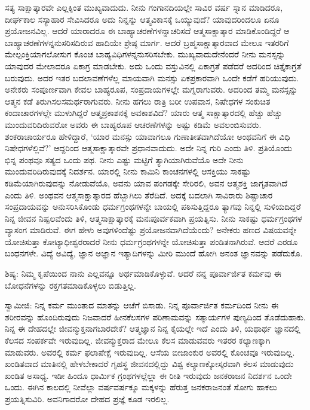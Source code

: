 ಸತ್ಯ ಸಾಕ್ಷಾತ್ಕಾರವೇ ಎಲ್ಲಕ್ಕಿಂತ ಮುಖ್ಯವಾದುದು. ನೀನು ಗಂಗಾನದಿಯಲ್ಲೇ ಸಾವಿರ ವರ್ಷ ಸ್ನಾನ ಮಾಡಿದರೂ, ದೀರ್ಘಕಾಲ ಸಸ್ಯಾಹಾರ ಸೇವಿಸಿದರೂ ಅದು ನಿನ್ನನ್ನು ಆತ್ಮವಿಕಾಸಕ್ಕೆ ಒಯ್ಯುವುದೆ? ಯಾವುದರಿಂದಲೂ ಏನೂ ಪ್ರಯೋಜನವಿಲ್ಲ. ಆದರೆ ಯಾರಾದರೂ ಈ ಬಾಹ್ಯಾಚರಣೆಗಳನ್ನಾಚರಿಸದೆ ಆತ್ಮಸಾಕ್ಷಾತ್ಕಾರ ಮಾಡಿಕೊಂಡಿದ್ದರೆ ಆ ಬಾಹ್ಯಾಚರಣೆಗಳನ್ನನುಸರಿಸದಿರುವ ಹಾದಿಯೇ ಶ್ರೇಷ್ಠ ಮಾರ್ಗ. ಆದರೆ ಬ್ರಹ್ಮಸಾಕ್ಷಾತ್ಕಾರವಾದ ಮೇಲೂ ಇತರರಿಗೆ ಮೇಲ್ಪಂಕ್ತಿಯಾಗಲೋಸುಗ ಕೊಂಚ ಬಾಹ್ಯವಿಧಿಗಳನ್ನನುಸರಿಸಬೇಕು. ಮುಖ್ಯವಾದುದೇನೆಂದರೆ ನೀನು ಮನಸ್ಸನ್ನು ಯಾವುದರ ಮೇಲಾದರೂ ಏಕಾಗ್ರ ಮಾಡಬೇಕು. ಅದು ಒಂದು ವಸ್ತುವಿನಲ್ಲಿ ಏಕಾಗ್ರತೆ ಪಡೆದರೆ ಅದರಿಂದ ಚಿತ್ತೈಕಾಗ್ರತೆ ಬರುವುದು. ಅದರ ಇತರ ಬದಲಾವಣೆಗಳೆಲ್ಲ ಮಾಯವಾಗಿ ಮನಸ್ಸು ಏಕಪ್ರಕಾರವಾಗಿ ಒಂದೇ ಕಡೆಗೆ ಹರಿಯುವುದು. ಅನೇಕರು ಸಂಪೂರ್ಣವಾಗಿ ಕೇವಲ ಬಾಹ್ಯರೂಪ, ಸಂಪ್ರದಾಯಗಳಲ್ಲೇ ಮಗ್ನರಾಗುವರು. ಅದರಿಂದ ತಮ್ಮ ಮನಸ್ಸನ್ನು ಆತ್ಮನ ಕಡೆ ತಿರುಗಿಸಲಸಮರ್ಥರಾಗುವರು. ನೀನು ಹಗಲು ರಾತ್ರಿ ಬರೀ ಉಪವಾಸ, ನಿಷೇಧಗಳ ಸಂಕುಚಿತ ಕಂದಾಚಾರಗಳಲ್ಲೇ ಮುಳುಗಿದ್ದರೆ ಆತ್ಮಪ್ರಕಾಶನಕ್ಕೆ ಅವಕಾಶವಿದೆ? ಯಾರು ಆತ್ಮ ಸಾಕ್ಷಾತ್ಕಾರದಲ್ಲಿ ಹೆಚ್ಚು ಹೆಚ್ಚು ಮುಂದುವರಿದಿರುವರೋ ಅವರು ಈ ಬಾಹ್ಯರೂಪ ಆಚರಣೆಗಳನ್ನು ಅಷ್ಟು ಕಡಿಮೆ ಅವಲಂಬಿಸುವರು. ಶಂಕರಾಚಾರ್ಯರೂ ಹೇಳಿದ್ದಾರೆ, ‘ಯಾರ ಮನಸ್ಸು ಯಾವಾಗಲೂ ಗುಣಾತೀತವಾಗಿದೆಯೋ ಅಂಥವನಿಗೆ ಈ ವಿಧಿ ನಿಷೇಧಗಳೆಲ್ಲಿವೆ?’ ಆದ್ದರಿಂದ ಆತ್ಮಸಾಕ್ಷಾತ್ಕಾರವೇ ಪ್ರಧಾನವಾದುದು. ಅದೇ ನಿನ್ನ ಗುರಿ ಎಂದು ತಿಳಿ. ಪ್ರತಿಯೊಂದು ಭಿನ್ನ ಪಂಥವೂ ಸತ್ಯದ ಒಂದು ಪಥ. ನೀನು ಎಷ್ಟು ಮಟ್ಟಿಗೆ ತ್ಯಾಗಿಯಾಗಿರುವೆಯೊ ಅದೇ ನೀನು ಮುಂದುವರಿದಿರುವುದಕ್ಕೆ ನಿದರ್ಶನ. ಯಾರಲ್ಲಿ ನೀನು ಕಾಮಿನಿ ಕಾಂಚನಗಳಲ್ಲಿ ಆಸಕ್ತಿಯು ಸಾಕಷ್ಟು ಕಡಿಮೆಯಾಗಿರುವುದನ್ನು ನೋಡುವೆಯೊ, ಅವನು ಯಾವ ಪಂಗಡಕ್ಕೇ ಸೇರಿರಲಿ, ಅವನ ಆತ್ಮಶಕ್ತಿ ಜಾಗೃತವಾಗಿದೆ ಎಂದು ತಿಳಿ. ಅಂಥವನ ಆತ್ಮಸಾಕ್ಷಾತ್ಕಾರದ ಹೆಬ್ಬಾಗಿಲು ತೆರೆದಿದೆ. ಅದಕ್ಕೆ ಬದಲಾಗಿ ಸಾವಿರಾರು ಶಿಷ್ಟಾಚಾರ ಸಂಪ್ರದಾಯವನ್ನು ಅನುಸರಿಸಿಕೊಂಡು ಧರ್ಮಗ್ರಂಥಗಳನ್ನೇ ಬಾಯಲ್ಲಿ ಪಠಿಸುತ್ತಿದ್ದರೂ ತ್ಯಾಗವು ನಿನ್ನಲ್ಲಿ ಸುಳಿಯದಿದ್ದರೆ ನಿನ್ನ ಜೀವನ ನಿಷ್ಪಲವೆಂದು ತಿಳಿ, ಆತ್ಮಸಾಕ್ಷಾತ್ಕಾರಕ್ಕೆ ಮನಃಪೂರ್ವಕವಾಗಿ ಪ್ರಯತ್ನಿಸು. ನೀನು ಸಾಕಷ್ಟು ಧರ್ಮಗ್ರಂಥಗಳ ವ್ಯಾಸಂಗ ಮಾಡಿರುವೆ. ಈಗ ಹೇಳು ಅವುಗಳಿಂದೆಷ್ಟು ಪ್ರಯೋಜನವಾಗಿದೆಯೆಂದು? ಅನೇಕರು ಹಣದ ವಿಷಯವನ್ನೇ ಯೋಚಿಸುತ್ತಾ ಕೋಟ್ಯಾಧೀಶ್ವರರಾದರೆ ನೀನು ಧರ್ಮಗ್ರಂಥಗಳನ್ನೇ ಯೋಚಿಸುತ್ತಾ ಪಂಡಿತನಾಗಿರುವೆ. ಆದರೆ ಎರಡೂ ಬಂಧನಗಳೇ. ವಿದ್ಯೆ ಅವಿದ್ಯೆ, ಜ್ಞಾನ ಅಜ್ಞಾನ ಇತ್ಯಾದಿಗಳನ್ನು ಮೀರಿ ಮುಂದೆ ಹೋಗಿ ಅನಂತ ಜ್ಞಾನವನ್ನು ಪಡೆದುಕೊ.

ಶಿಷ್ಯ: ನಿಮ್ಮ ಕೃಪೆಯಿಂದ ನಾನು ಎಲ್ಲವನ್ನೂ ಅರ್ಥಮಾಡಿಕೊಳ್ಳುವೆ. ಆದರೆ ನನ್ನ ಪೂರ್ವಾರ್ಜಿತ ಕರ್ಮವು ಈ ಬೋಧನೆಗಳನ್ನು ರಕ್ತಗತಮಾಡಿಕೊಳ್ಳಲು ಬಿಡುತ್ತಿಲ್ಲ.

ಸ್ವಾಮೀಜಿ: ನಿನ್ನ ಕರ್ಮ ಮುಂತಾದ ಮಾತನ್ನು ಆಚೆಗೆ ಬಿಸಾಡು. ನಿನ್ನ ಪೂರ್ವಾರ್ಜಿತ ಕರ್ಮದಿಂದ ನೀನು ಈ ಶರೀರವನ್ನು ಹೊಂದಿರುವುದು ನಿಜವಾದರೆ ಹೀನಕೆಲಸಗಳ ಪರಿಣಾಮವನ್ನು ಸತ್ಕಾರ್ಯಗಳ ಪುಣ್ಯದಿಂದ ತೊಡೆದುಹಾಕು. ನಿನ್ನ ಈ ದೇಹದಲ್ಲೇ ಜೀವನ್ಮುಕ್ತನಾಗಬಾರದೇಕೆ? ಆತ್ಮಜ್ಞಾನ ನಿನ್ನ ಕೈಯಲ್ಲೇ ಇದೆ ಎಂದು ತಿಳಿ, ಯಥಾರ್ಥ ಜ್ಞಾನದಲ್ಲಿ ಕೆಲಸದ ಸಂಪರ್ಕವೇ ಇರುವುದಿಲ್ಲ. ಜೀವನ್ಮುಕ್ತರಾದ ಮೇಲೂ ಕೆಲಸ ಮಾಡುವವರು ಇತರರ ಕಲ್ಯಾಣಕ್ಕಾಗಿ ಮಾಡುವರು. ಅವರಲ್ಲಿ ಕರ್ಮ ಫಲಾಪೇಕ್ಷೆ ಇರುವುದಿಲ್ಲ. ಆಸೆಯ ಬೀಜಾಂಕುರ ಅವರಲ್ಲಿ ಕೊಂಚವೂ ಇರುವುದಿಲ್ಲ. ಖಂಡಿತವಾದ ಮಾತಿನಲ್ಲಿ ಹೇಳಬೇಕಾದರೆ ಗೃಹಸ್ಥ ಜೀವನದಲ್ಲಿದ್ದು ವಿಶ್ವ ಕಲ್ಯಾಣಕ್ಕೋಸ್ಕರವಾಗಿ ಕೆಲಸ ಮಾಡುವುದು ಖಂಡಿತ ಅಸಾಧ್ಯ. ಇಡೀ ಹಿಂದೂ ಧಾರ್ಮಿಕ ಗ್ರಂಥಗಳಲ್ಲೆಲ್ಲಾ ಈ ರೀತಿ ಇರುವುದು ಜನಕರಾಜನ ನಿದರ್ಶನ ಒಂದೇ ಒಂದು. ಈಗಿನ ಕಾಲದಲ್ಲಿ ನೀವೆಲ್ಲಾ ವರ್ಷವರ್ಷಕ್ಕೂ ಮಕ್ಕಳನ್ನು ಹೆರುತ್ತ ಜನಕರಾಜನಂತೆ ಸೋಗು ಹಾಕಲು ಪ್ರಯತ್ನಿಸುವಿರಿ. ಅವನಿಗಾದರೋ ದೇಹದ ಪ್ರಜ್ಞೆ ಕೂಡ ಇರಲಿಲ್ಲ.

